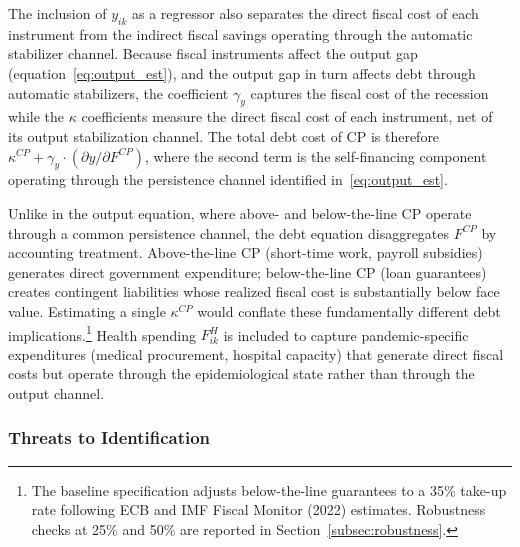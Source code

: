 \documentclass[12pt, a4paper]{article}
\begin{document}
The inclusion of $y_{ik}$ as a regressor also separates the direct fiscal cost of each instrument from the indirect fiscal savings operating through the automatic stabilizer channel. Because fiscal instruments affect the output gap (equation~\ref{eq:output_est}), and the output gap in turn affects debt through automatic stabilizers, the coefficient $\gamma_y$ captures the fiscal cost of the recession while the $\kappa$ coefficients measure the direct fiscal cost of each instrument, net of its output stabilization channel. The total debt cost of CP is therefore $\kappa^{CP} + \gamma_y \cdot (\partial y / \partial F^{CP})$, where the second term is the self-financing component operating through the persistence channel identified in~\eqref{eq:output_est}.

Unlike in the output equation, where above- and below-the-line CP operate through a common persistence channel, the debt equation disaggregates $F^{CP}$ by accounting treatment. Above-the-line CP (short-time work, payroll subsidies) generates direct government expenditure; below-the-line CP (loan guarantees) creates contingent liabilities whose realized fiscal cost is substantially below face value. Estimating a single $\kappa^{CP}$ would conflate these fundamentally different debt implications.\footnote{The baseline specification adjusts below-the-line guarantees to a 35\% take-up rate following ECB and IMF Fiscal Monitor (2022) estimates. Robustness checks at 25\% and 50\% are reported in Section~\ref{subsec:robustness}.} Health spending $F_{ik}^H$ is included to capture pandemic-specific expenditures (medical procurement, hospital capacity) that generate direct fiscal costs but operate through the epidemiological state rather than through the output channel.

\subsubsection{Threats to Identification}
\end{document}
